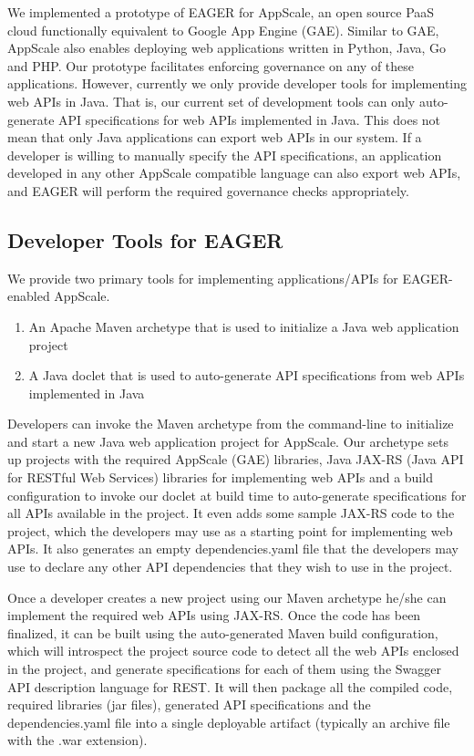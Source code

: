 We implemented a prototype of EAGER for AppScale, an open source PaaS cloud functionally equivalent to Google App Engine (GAE). Similar to
GAE, AppScale also enables deploying web applications written in Python, Java, Go and PHP. Our prototype facilitates enforcing governance on
any of these applications. However, currently we only provide developer tools for implementing web APIs in Java. That is, our current set of development
tools can only auto-generate API specifications for web APIs implemented in Java. This does not mean that only Java applications can export web
APIs in our system. If a developer is willing to manually specify the API specifications, an application developed in any other AppScale compatible
language can also export web APIs, and EAGER will perform the required governance checks appropriately.

\subsection{Developer Tools for EAGER}
We provide two primary tools for implementing applications/APIs for EAGER-enabled AppScale.
\begin{enumerate}
\item An Apache Maven archetype that is used to initialize a Java web application project
\item A Java doclet that is used to auto-generate API specifications from web APIs implemented in Java
\end{enumerate}

Developers can invoke the Maven archetype from the command-line to initialize and start a new Java web application project for AppScale. Our
archetype sets up projects with the required AppScale (GAE) libraries, Java JAX-RS (Java API for RESTful Web Services) libraries 
for implementing web APIs and a build configuration to
invoke our doclet at build time to auto-generate specifications for all APIs available in the project. It even adds some sample JAX-RS code to
the project, which the developers may use as a starting point for implementing web APIs. It also generates an empty dependencies.yaml file that the
developers may use to declare any other API dependencies that they wish to use in the project.

Once a developer creates a new project using our Maven archetype he/she can implement the required web APIs using JAX-RS. Once the code has 
been finalized, it can be built using the auto-generated Maven build configuration, which will introspect the project source code to detect all
the web APIs enclosed in the project, and generate specifications for each of them using the Swagger API description language for REST. It will
then package all the compiled code, required libraries (jar files), generated API specifications and the dependencies.yaml file into a single deployable
artifact (typically an archive file with the .war extension).

